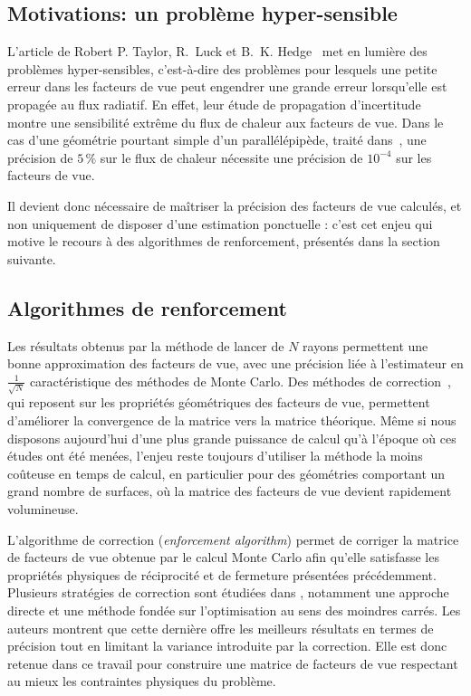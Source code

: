 \subsection{Motivations: un problème hyper-sensible}
\label{part:hypersens}

L'article de Robert P. Taylor, R.~Luck et B.~K. Hedge~\cite{hypersensitive} met en lumière des problèmes hyper-sensibles, c'est-à-dire des problèmes pour lesquels une petite erreur dans les facteurs de vue peut engendrer une grande erreur lorsqu'elle est propagée au flux radiatif. En effet, leur étude de propagation d'incertitude montre une sensibilité extrême du flux de chaleur aux facteurs de vue. Dans le cas d'une géométrie pourtant simple d'un parallélépipède, traité dans~\cite{incro}, une précision de $5\,\%$ sur le flux de chaleur nécessite une précision de $10^{-4}$ sur les facteurs de vue.

Il devient donc nécessaire de maîtriser la précision des facteurs de vue calculés, et non uniquement de disposer d'une estimation ponctuelle : c'est cet enjeu qui motive le recours à des algorithmes de renforcement, présentés dans la section suivante.

\subsection{Algorithmes de renforcement}
\label{part:renforcement}
Les résultats obtenus par la méthode de lancer de $N$ rayons permettent une bonne approximation des facteurs de vue, avec une précision liée à l'estimateur en $\frac{1}{\sqrt{N}}$ caractéristique des méthodes de Monte Carlo. Des méthodes de correction~\cite{renforcement95}, qui reposent sur les propriétés géométriques des facteurs de vue, permettent d'améliorer la convergence de la matrice vers la matrice théorique. Même si nous disposons aujourd'hui d'une plus grande puissance de calcul qu'à l'époque où ces études ont été menées, l'enjeu reste toujours d'utiliser la méthode la moins coûteuse en temps de calcul, en particulier pour des géométries comportant un grand nombre de surfaces, où la matrice des facteurs de vue devient rapidement volumineuse.

L'algorithme de correction (\textit{enforcement algorithm}) permet de corriger la matrice de facteurs de vue obtenue par le calcul Monte Carlo afin qu'elle satisfasse les propriétés physiques de réciprocité et de fermeture présentées précédemment. Plusieurs stratégies de correction sont étudiées dans \cite{renforcement95}, notamment une approche directe et une méthode fondée sur l'optimisation au sens des moindres carrés. Les auteurs montrent que cette dernière offre les meilleurs résultats en termes de précision tout en limitant la variance introduite par la correction. Elle est donc retenue dans ce travail pour construire une matrice de facteurs de vue respectant au mieux les contraintes physiques du problème.

